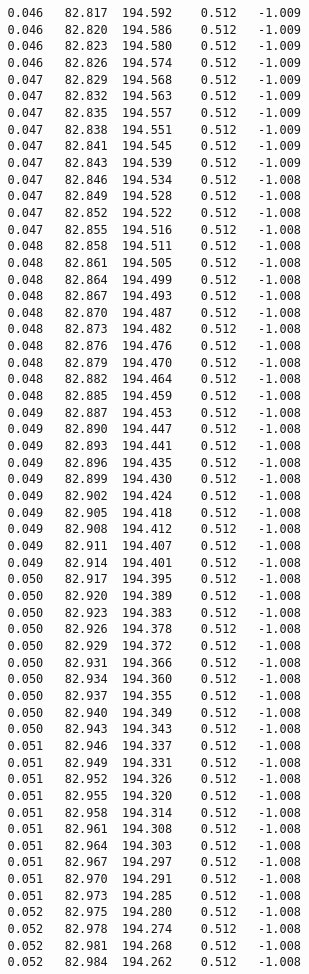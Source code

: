 \begin{verbatim}
   0.046   82.817  194.592    0.512   -1.009
   0.046   82.820  194.586    0.512   -1.009
   0.046   82.823  194.580    0.512   -1.009
   0.046   82.826  194.574    0.512   -1.009
   0.047   82.829  194.568    0.512   -1.009
   0.047   82.832  194.563    0.512   -1.009
   0.047   82.835  194.557    0.512   -1.009
   0.047   82.838  194.551    0.512   -1.009
   0.047   82.841  194.545    0.512   -1.009
   0.047   82.843  194.539    0.512   -1.009
   0.047   82.846  194.534    0.512   -1.008
   0.047   82.849  194.528    0.512   -1.008
   0.047   82.852  194.522    0.512   -1.008
   0.047   82.855  194.516    0.512   -1.008
   0.048   82.858  194.511    0.512   -1.008
   0.048   82.861  194.505    0.512   -1.008
   0.048   82.864  194.499    0.512   -1.008
   0.048   82.867  194.493    0.512   -1.008
   0.048   82.870  194.487    0.512   -1.008
   0.048   82.873  194.482    0.512   -1.008
   0.048   82.876  194.476    0.512   -1.008
   0.048   82.879  194.470    0.512   -1.008
   0.048   82.882  194.464    0.512   -1.008
   0.048   82.885  194.459    0.512   -1.008
   0.049   82.887  194.453    0.512   -1.008
   0.049   82.890  194.447    0.512   -1.008
   0.049   82.893  194.441    0.512   -1.008
   0.049   82.896  194.435    0.512   -1.008
   0.049   82.899  194.430    0.512   -1.008
   0.049   82.902  194.424    0.512   -1.008
   0.049   82.905  194.418    0.512   -1.008
   0.049   82.908  194.412    0.512   -1.008
   0.049   82.911  194.407    0.512   -1.008
   0.049   82.914  194.401    0.512   -1.008
   0.050   82.917  194.395    0.512   -1.008
   0.050   82.920  194.389    0.512   -1.008
   0.050   82.923  194.383    0.512   -1.008
   0.050   82.926  194.378    0.512   -1.008
   0.050   82.929  194.372    0.512   -1.008
   0.050   82.931  194.366    0.512   -1.008
   0.050   82.934  194.360    0.512   -1.008
   0.050   82.937  194.355    0.512   -1.008
   0.050   82.940  194.349    0.512   -1.008
   0.050   82.943  194.343    0.512   -1.008
   0.051   82.946  194.337    0.512   -1.008
   0.051   82.949  194.331    0.512   -1.008
   0.051   82.952  194.326    0.512   -1.008
   0.051   82.955  194.320    0.512   -1.008
   0.051   82.958  194.314    0.512   -1.008
   0.051   82.961  194.308    0.512   -1.008
   0.051   82.964  194.303    0.512   -1.008
   0.051   82.967  194.297    0.512   -1.008
   0.051   82.970  194.291    0.512   -1.008
   0.051   82.973  194.285    0.512   -1.008
   0.052   82.975  194.280    0.512   -1.008
   0.052   82.978  194.274    0.512   -1.008
   0.052   82.981  194.268    0.512   -1.008
   0.052   82.984  194.262    0.512   -1.008

\end{verbatim}
